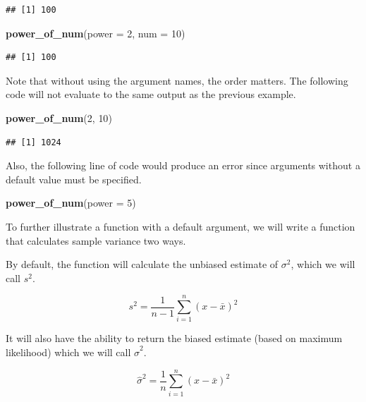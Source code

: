 \documentclass[]{book}
\newenvironment{Shaded}{\begin{snugshade}}{\end{snugshade}}
\newcommand{\KeywordTok}[1]{\textcolor[rgb]{0.13,0.29,0.53}{\textbf{#1}}}
\newcommand{\DataTypeTok}[1]{\textcolor[rgb]{0.13,0.29,0.53}{#1}}
\newcommand{\DecValTok}[1]{\textcolor[rgb]{0.00,0.00,0.81}{#1}}
\newcommand{\NormalTok}[1]{#1}
\theoremstyle{definition}
\theoremstyle{definition}
\theoremstyle{definition}
\theoremstyle{remark}
\begin{document}
\begin{verbatim}
## [1] 100
\end{verbatim}

\begin{Shaded}
\begin{Highlighting}[]
\KeywordTok{power_of_num}\NormalTok{(}\DataTypeTok{power =} \DecValTok{2}\NormalTok{, }\DataTypeTok{num =} \DecValTok{10}\NormalTok{)}
\end{Highlighting}
\end{Shaded}

\begin{verbatim}
## [1] 100
\end{verbatim}

Note that without using the argument names, the order matters. The
following code will not evaluate to the same output as the previous
example.

\begin{Shaded}
\begin{Highlighting}[]
\KeywordTok{power_of_num}\NormalTok{(}\DecValTok{2}\NormalTok{, }\DecValTok{10}\NormalTok{)}
\end{Highlighting}
\end{Shaded}

\begin{verbatim}
## [1] 1024
\end{verbatim}

Also, the following line of code would produce an error since arguments
without a default value must be specified.

\begin{Shaded}
\begin{Highlighting}[]
\KeywordTok{power_of_num}\NormalTok{(}\DataTypeTok{power =} \DecValTok{5}\NormalTok{)}
\end{Highlighting}
\end{Shaded}

To further illustrate a function with a default argument, we will write
a function that calculates sample variance two ways.

By default, the function will calculate the unbiased estimate of
\(\sigma^2\), which we will call \(s^2\).

\[
s^2 = \frac{1}{n - 1}\sum_{i=1}^{n}(x - \bar{x})^2
\]

It will also have the ability to return the biased estimate (based on
maximum likelihood) which we will call \(\hat{\sigma}^2\).

\[
\hat{\sigma}^2 = \frac{1}{n}\sum_{i=1}^{n}(x - \bar{x})^2
\]
\end{document}
